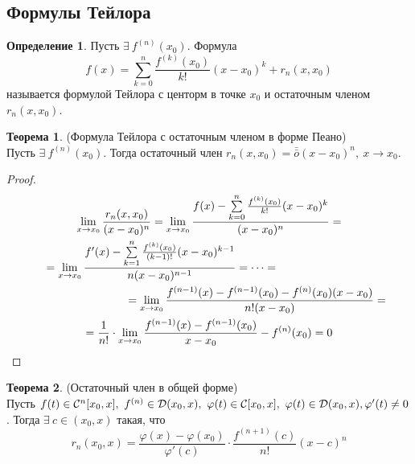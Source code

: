 \documentclass[a4paper, 12pt]{article}
\renewcommand{\phi}{\varphi}
\newcommand\tab[1][.5cm]{\hspace*{#1}}
\theoremstyle{definition}
\newtheorem*{definition}{Определение}
\newtheorem*{theorem}{Теорема}
\begin{document}
        \subsection{Формулы Тейлора}
        \begin{definition}
            Пусть $\exists\ f^{(n)}(x_0)$. Формула
            \[f(x)=\sum\limits_{k=0}^{n}\frac{f^{(k)}(x_0)}{k!}(x-x_0)^k+r_n(x,x_0)\]
            называется формулой Тейлора с центорм в точке $x_0$ и остаточным членом $r_n(x,x_0)$.
        \end{definition} 
        \begin{theorem} (Формула Тейлора с остаточным членом в форме Пеано)\\
            Пусть $\exists\ f^{(n)}(x_0)$. Тогда остаточный член $r_n(x,x_0)=\bar{\bar{o}}{(x-x_0)^n},\ x\to x_0$.
        \end{theorem} 
        \begin{proof}
            \begin{multline*}
                \lim\limits_{x\to x_0}\frac{r_n(x,x_0)}{(x-x_0)^n}=\lim\limits_{x\to x_0}\frac{f(x)-\sum\limits_{k=0}^{n}\frac{f^{(k)}(x_0)}{k!}(x-x_0)^k}{(x-x_0)^n}=\\
                =\lim\limits_{x\to x_0}\frac{f'(x)-\sum\limits_{k=1}^{n}\frac{f^{(k)}(x_0)}{(k-1)!}(x-x_0)^{k-1}}{n(x-x_0)^{n-1}}=\dots=\tab[3cm]\\
                \tab[3cm]=\lim\limits_{x\to x_0}\frac{f^{(n-1)}(x)-f^{(n-1)}(x_0)-f^{(n)}(x_0)(x-x_0)}{n!(x-x_0)}=\\
                =\frac{1}{n!}\cdot \lim\limits_{x\to x_0}\frac{f^{(n-1)}(x)-f^{(n-1)}(x_0)}{x-x_0}-f^{(n)}(x_0)=0
            \end{multline*}
        \end{proof} 
        \begin{theorem} (Остаточный член в общей форме)\\
            Пусть $f(t)\in \mathcal{C}^n[x_0,x],\ f^{(n)}\in \mathcal{D}(x_0,x),\ \phi(t)\in \mathcal{C}[x_0,x],\ \phi(t)\in \mathcal{D}(x_0,x),\\
            \phi'(t)\ne 0$. Тогда $\exists\ c\in (x_0,x)$ такая, что 
            \[r_n(x_0,x)= \frac{\phi(x)-\phi(x_0)}{\phi'(c)}\cdot \frac{f^{(n+1)}(c)}{n!}(x-c)^n\]
        \end{theorem} 
\end{document}
